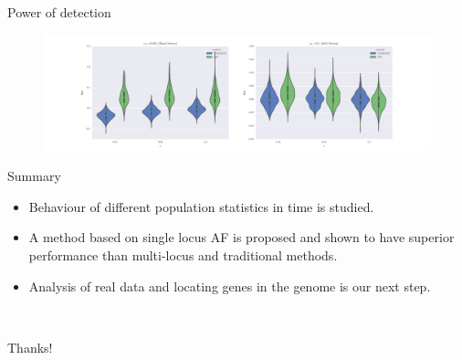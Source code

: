 \documentclass[t]{beamer} %
\begin{document}
\begin{frame}{Power of detection}
	\begin{figure}
		\centering \includegraphics[trim= 1in 0 1in 0 ,clip,		
		width=\textwidth]{bias}
	\end{figure}
\end{frame}

\begin{frame}{Summary}
\begin{itemize}
\item Behaviour of different population statistics in time is studied.
\item A method based on single locus AF is proposed and shown to have superior performance than multi-locus and traditional methods.
\item Analysis of real data and locating genes in the genome is our next step.
\end{itemize}

\end{frame}




%





\begin{frame}{\ }
\vspace{1	in}
\begin{center}
	\huge{Thanks!}\\
\end{center}

\end{frame}
\end{document}
